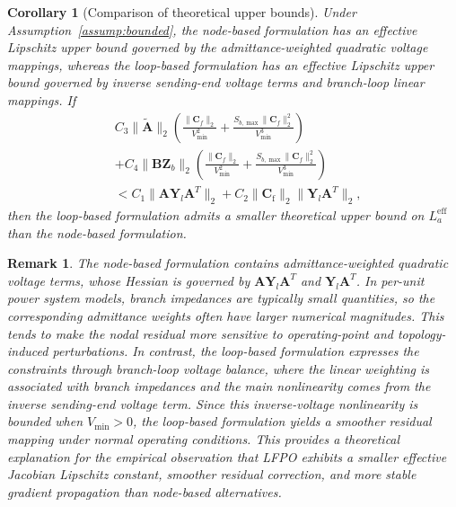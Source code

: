 \documentclass[journal]{IEEEtran}
\newtheorem{corollary}{Corollary}
\newtheorem{remark}{Remark}
\begin{document}
\begin{corollary}[Comparison of theoretical upper bounds]
\label{cor:loop_smaller}
Under Assumption~\ref{assump:bounded}, the node-based formulation has an effective Lipschitz upper bound governed by the admittance-weighted quadratic voltage mappings, whereas the loop-based formulation has an effective Lipschitz upper bound governed by inverse sending-end voltage terms and branch-loop linear mappings. If
\begin{equation}
\begin{aligned}
&
C_3\|\tilde{\mathbf{A}}\|_2
\left(
\frac{\|\mathbf{C}_f\|_2}{V_{\min}^{2}}
+
\frac{S_{b,\max}\|\mathbf{C}_f\|_2^{2}}{V_{\min}^{3}}
\right)  \\
&
+C_4\|\mathbf{B}\mathbf{Z}_b\|_2
\left(
\frac{\|\mathbf{C}_f\|_2}{V_{\min}^{2}}
+\frac{S_{b,\max}\|\mathbf{C}_f\|_2^{2}}{V_{\min}^{3}}
\right)  \\
&<
C_1\|\mathbf{A}\mathbf{Y}_l\mathbf{A}^T\|_2
+
C_2\|\mathbf{C}_{\mathrm{f}}\|_2\|\mathbf{Y}_l\mathbf{A}^T\|_2,
\end{aligned}
\end{equation}
then the loop-based formulation admits a smaller theoretical upper bound on $L_a^{\mathrm{eff}}$ than the node-based formulation.
\end{corollary}

\begin{remark}
The node-based formulation contains admittance-weighted quadratic voltage terms, whose Hessian is governed by $\mathbf{A}\mathbf{Y}_l\mathbf{A}^T$ and $\mathbf{Y}_l\mathbf{A}^T$. In per-unit power system models, branch impedances are typically small quantities, so the corresponding admittance weights often have larger numerical magnitudes. This tends to make the nodal residual more sensitive to operating-point and topology-induced perturbations. In contrast, the loop-based formulation expresses the constraints through branch-loop voltage balance, where the linear weighting is associated with branch impedances and the main nonlinearity comes from the inverse sending-end voltage term. Since this inverse-voltage nonlinearity is bounded when $V_{\min}>0$, the loop-based formulation yields a smoother residual mapping under normal operating conditions. This provides a theoretical explanation for the empirical observation that LFPO exhibits a smaller effective Jacobian Lipschitz constant, smoother residual correction, and more stable gradient propagation than node-based alternatives.
\end{remark}
\end{document}
